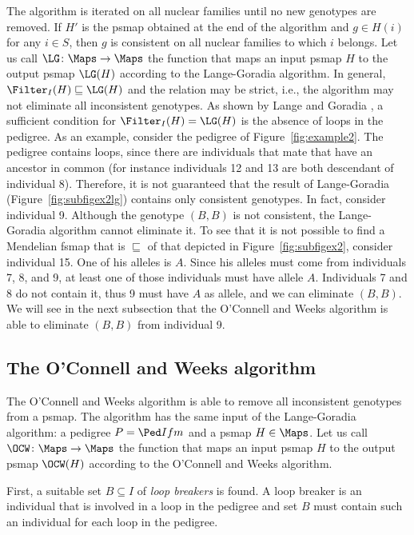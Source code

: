 The algorithm is iterated on all nuclear families until no new genotypes are removed.
If $H'$ is the psmap obtained at the end of the algorithm and $g\in H(i)$ for any $i\in S$,
then $g$ is consistent on all nuclear families to which $i$ belongs.
Let us call $\LG\colon \Maps\to\Maps$
the function that maps an input psmap $H$ to the output psmap $\LG(H)$ according to the
Lange-Goradia algorithm.
In general, $\Filter_I(H) \sqsubseteq \LG(H)$ and the relation may be strict, i.e.,
the algorithm may not eliminate all inconsistent genotypes. 
As shown by Lange and Goradia \cite{LangeGoradia1987}, a sufficient
condition for $\Filter_I(H) = \LG(H)$ is the absence of loops in the
pedigree. As an example, consider the pedigree of Figure~\ref{fig:example2}. The
pedigree contains loops, since there are individuals that mate that have an
ancestor in common (for instance individuals 12 and 13 are both descendant of
individual 8). Therefore, it is not guaranteed that the result of Lange-Goradia
(Figure~\ref{fig:subfigex2lg}) contains only consistent genotypes. In fact,
consider individual 9. Although the genotype $(B,B)$ is not consistent, the
Lange-Goradia algorithm cannot eliminate it. To see that it is not possible to
find a Mendelian fsmap that is $\sqsubseteq$ of that depicted in
Figure~\ref{fig:subfigex2}, consider individual 15. One of his alleles is
$A$. Since his alleles must come from individuals 7, 8, and 9, at least one of
those individuals must have allele $A$. Individuals 7 and 8 do not contain it,
thus 9 must have $A$ as allele, and we can eliminate $(B,B)$. We will see in the
next subsection that the O'Connell and Weeks algorithm is able to eliminate
$(B,B)$ from individual 9.

\subsection{The O'Connell and Weeks algorithm}
\label{sec:ow}

The O'Connell and Weeks algorithm \cite{OConnellWeeks1999} is able to remove all
inconsistent genotypes from a psmap.
The algorithm has the same input of the Lange-Goradia algorithm:
a pedigree $P=\Ped I f m$ and a psmap $H\in\Maps$.
Let us call $\OCW\colon \Maps\to\Maps$
the function that maps an input psmap $H$ to the output psmap $\OCW(H)$ according to the
O'Connell and Weeks algorithm.

First, a suitable set $B\subseteq I$
of \emph{loop breakers} is found. 
A loop breaker is
an individual that is involved in a loop in the pedigree and set
$B$ must contain such an individual for each loop in the pedigree.

